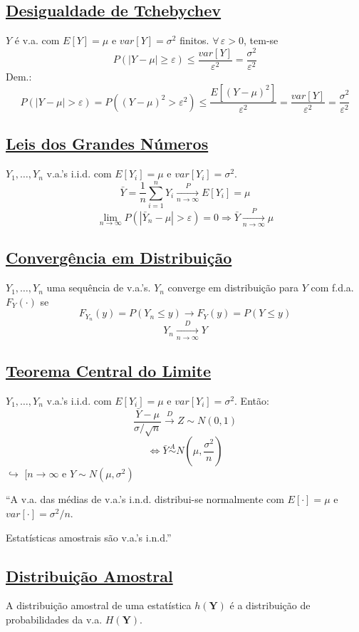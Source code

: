 \documentclass[11pt,a4paper]{article}
\begin{document}
\subsection*{\underline{Desigualdade de Tchebychev}}
$Y$ é v.a. com $E[Y]=\mu$ e $var[Y]=\sigma^2$ finitos. $\forall\,\varepsilon>0$, tem-se
\[ P(|Y-\mu|\geq\varepsilon) \leq \frac{var[Y]}{\varepsilon^2} = \frac{\sigma^2}{\varepsilon^2} \]
Dem.:
\[ P(|Y-\mu|>\varepsilon) = P((Y-\mu)^2>\varepsilon^2) \leq \frac{E[(Y-\mu)^2]}{\varepsilon^2} = \frac{var[Y]}{\varepsilon^2} = \frac{\sigma^2}{\varepsilon^2} \]

\subsection*{\underline{Leis dos Grandes Números}}
$Y_1,\ldots,Y_n$ v.a.'s i.i.d. com $E[Y_i]=\mu$ e $var[Y_i]=\sigma^2$.
\[ \bar{Y} = \frac{1}{n}\sum_{i=1}^{n}Y_i \xrightarrow[n\to\infty]{P} E[Y_i] = \mu \]
\[ \lim_{n\to\infty} P(|\bar{Y}_n-\mu|>\varepsilon) = 0 \Rightarrow \bar{Y} \xrightarrow[n\to\infty]{P} \mu \]

\subsection*{\underline{Convergência em Distribuição}}
$Y_1,\ldots,Y_n$ uma sequência de v.a.'s. $Y_n$ converge em distribuição para $Y$ com f.d.a. $F_Y(\cdot)$ se
\[ F_{Y_n}(y) = P(Y_n\leq y) \to F_Y(y) = P(Y\leq y) \]
\[ Y_n \xrightarrow[n\to\infty]{D} Y \]

\subsection*{\underline{Teorema Central do Limite}}
$Y_1,\ldots,Y_n$ v.a.'s i.i.d. com $E[Y_i]=\mu$ e $var[Y_i]=\sigma^2$. Então:
\[ \frac{\bar{Y}-\mu}{\sigma/\sqrt{n}} \xrightarrow{\;D\;} Z \sim N(0,1) \]
\[ \iff \bar{Y} \overset{A}{\sim} N\!\left(\mu,\frac{\sigma^2}{n}\right) \]
$\hookrightarrow$ [$n\to\infty$ e $Y\sim N(\mu,\sigma^2)$

``A v.a. das médias de v.a.'s i.n.d. distribui-se normalmente com $E[\cdot]=\mu$ e $var[\cdot]=\sigma^2/n$.

Estatísticas amostrais são v.a.'s i.n.d.''

\subsection*{\underline{Distribuição Amostral}}
A distribuição amostral de uma estatística $h(\mathbf{Y})$ é a distribuição de probabilidades da v.a. $H(\mathbf{Y})$.
\end{document}
